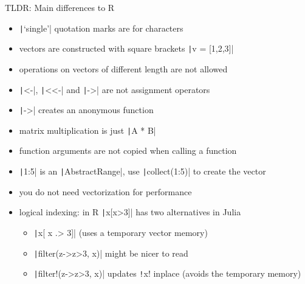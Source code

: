 \documentclass[aspectratio=169, 11pt, handout]{beamer}
\begin{document}
    \begin{frame}[fragile]{TLDR: Main differences to R}
        \begin{itemize}
            \item \texttt|‘single’| quotation marks are for characters
            \item vectors are constructed with square brackets \texttt|v = [1,2,3]|
            \item operations on vectors of different length are not allowed
            \item \texttt|<-|, \texttt|<<-| and \texttt|->| are not assignment operators
            \item \texttt|->| creates an anonymous function
            \pause
            \item matrix multiplication is just \texttt|A * B|
            \item function arguments are not copied when calling a function
            \item \texttt|1:5| is an \texttt|AbstractRange|, use \texttt|collect(1:5)| to create the vector
            \pause
            \item you do not need vectorization for performance
            \item logical indexing: in R \texttt|x[x>3]| has two alternatives in Julia
            \begin{itemize}
                \item \texttt|x[ x .> 3]| (uses a temporary vector memory)
                \item \texttt|filter(z->z>3, x)| might be nicer to read
                \item \texttt|filter!(z->z>3, x)| updates \texttt!x! inplace (avoids the temporary memory)
            \end{itemize}
        \end{itemize}
    \end{frame}
\end{document}
